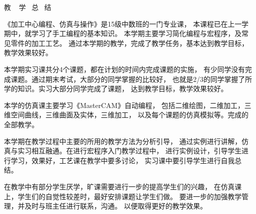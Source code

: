 \documentclass[a4paper,12pt]{article}
\numberwithin{table}{section}
\numberwithin{figure}{section}
\begin{document}
\newpage


\newpage


\newpage
\renewcommand{\baselinestretch}{1.3}
{
\begin{center}
	\huge \hei 教 ~ 学  ~总  ~结
\end{center}

 \large  \setlength{\parindent}{2em} 
 
《加工中心编程、仿真与操作》是15级中数班的一门专业课，
 本课程已在上一学期中，就学习了手工编程的基本知识。
 本学期主要学习简化编程与宏程序，及常见零件的加工工艺。
 通过本学期的教学，完成了教学任务，基本达到教学目标，教学效果较好。

本学期实习课共分4个课题，都在计划的时间内完成课题的实施，
有少同学没有完成课题。通过期末考试，大部分的同学掌握的比较好，
也就是2/3的同学掌握了所学的知识。实习大部分同学完成了课题，
达到教学目标，教学效果较好。

本学的仿真课主要学习《MasterCAM》自动编程，
包括二维绘图，二维加工，三维空间曲线，三维曲面及实体，三维加工，
以及每个课题的仿真模拟等。完成的全部教学。

本学期在教学过程中主要的所用的教学方法为分析引导，
通过实例进行讲解，仿真与实习相互融通。在进行宏程序入门教学过程中，
进行实例设计，引导学生进行学习，效果好，工艺课在教学中要多讨论，
实习课中要引导学生进行自我总结。

在教学中有部分学生厌学，旷课需要进行一步的提高学生们的兴趣，
在仿真课上，学生们的自觉性较差时，最好安排课题让学生们做。
要进一步的加强教学管理，并及时与班主任进行联系，沟通。
以便取得更好的教学效果。

}
\end{document}
